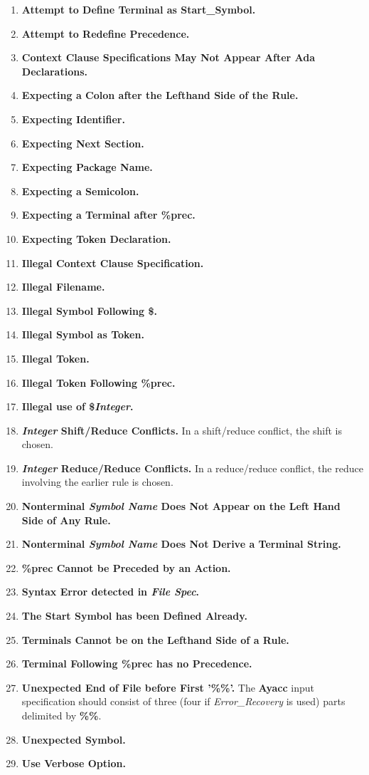 \begin{enumerate}
\item {\bf Attempt to Define Terminal as Start\_Symbol.}
\item {\bf Attempt to Redefine Precedence.}
\item {\bf Context Clause Specifications May Not Appear After Ada Declarations.}
\item {\bf Expecting a Colon after the Lefthand Side of the Rule.}
\item {\bf Expecting Identifier.}
\item {\bf Expecting Next Section.}
\item {\bf Expecting Package Name.}
\item {\bf Expecting a Semicolon.}
\item {\bf Expecting a Terminal after \%prec.}
\item {\bf Expecting Token Declaration.}
\item {\bf Illegal Context Clause Specification.}
\item {\bf Illegal Filename.}
\item {\bf Illegal Symbol Following \$.}
\item {\bf Illegal Symbol as Token.}
\item {\bf Illegal Token.}
\item {\bf Illegal Token Following \%prec.}
\item {\bf Illegal use of \${\it Integer}.}
\item {\bf {\it Integer} Shift/Reduce Conflicts.}
In a shift/reduce conflict, the shift is chosen.
\item {\bf {\it Integer} Reduce/Reduce Conflicts.}
In a reduce/reduce conflict, the reduce involving the earlier rule is chosen.
\item {\bf Nonterminal {\it Symbol Name} Does Not Appear on the Left Hand
Side of Any Rule.}
\item {\bf Nonterminal {\it Symbol Name} Does Not Derive a Terminal String.}
\item {\bf \%prec Cannot be Preceded by an Action.}
\item {\bf Syntax Error detected in {\it File Spec}.}
\item {\bf The Start Symbol has been Defined Already.}
\item {\bf Terminals Cannot be on the Lefthand Side of a Rule.}
\item {\bf Terminal Following \%prec has no Precedence.}
\item {\bf Unexpected End of File before First '\%\%'.}
The {\bf Ayacc} input specification should consist of three (four if
{\it Error\_Recovery} is used) parts delimited by {\bf \%\%}. 
\item {\bf Unexpected Symbol.}
\item {\bf Use Verbose Option.}
\end{enumerate}
